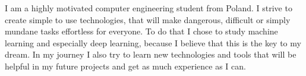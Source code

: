 

\begin{cvparagraph}

I am a highly motivated computer engineering student from Poland. I strive to create simple to use technologies, that will make dangerous, difficult or simply mundane tasks effortless for everyone. To do that I chose to study machine learning and especially deep learning, because I believe that this is the key to my dream. In my journey I also try to learn new technologies and tools that will be helpful in my future projects and get as much experience as I can.
\end{cvparagraph}
